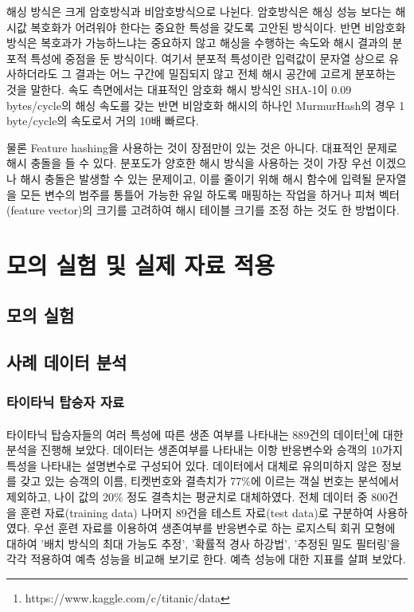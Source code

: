 \documentclass[oneside,b5paper,11pt]{book} %
\begin{document}
 해싱 방식은 크게 암호방식과 비암호방식으로 나뉜다. 암호방식은 해싱 성능 보다는 해시값 복호화가 어려워야 한다는 중요한 특성을 갖도록 고안된 방식이다. 반면 비암호화 방식은 복호과가 가능하느냐는 중요하지 않고 해싱을 수행하는 속도와 해시 결과의 분포적 특성에 중점을 둔 방식이다. 여기서 분포적 특성이란 입력값이 문자열 상으로 유사하더라도 그 결과는 어느 구간에 밀집되지 않고 전체 해시 공간에 고르게 분포하는 것을 말한다.\citep{Ramadhian2013} 속도 측면에서는 대표적인 암호화 해시 방식인 SHA-1이 0.09 bytes/cycle의 해싱 속도를 갖는 반면 비암호화 해시의 하나인 MurmurHash의 경우 1 byte/cycle의 속도로서 거의 10배 빠르다. 

 물론 Feature hashing을 사용하는 것이 장점만이 있는 것은 아니다. 대표적인 문제로 해시 충돌을 들 수 있다. 분포도가 양호한 해시 방식을 사용하는 것이 가장 우선 이겠으나 해시 충돌은 발생할 수 있는 문제이고, 이를 줄이기 위해 해시 함수에 입력될 문자열을 모든 변수의 범주를 통틀어 가능한 유일 하도록 매핑하는 작업을 하거나 피쳐 벡터(feature vector)의 크기를 고려하여 해시 테이블 크기를 조정 하는 것도 한 방법이다.



%
%
\chapter{모의 실험 및 실제 자료 적용}

\section{모의 실험}



\section{사례 데이터 분석}
\subsection{타이타닉 탑승자 자료}
 타이타닉 탑승자들의 여러 특성에 따른 생존 여부를 나타내는 889건의 데이터\footnote{https://www.kaggle.com/c/titanic/data}에 대한 분석을 진행해 보았다. 데이터는 생존여부를 나타내는 이항 반응변수와 승객의 10가지 특성을 나타내는 설명변수로 구성되어 있다. 데이터에서 대체로 유의미하지 않은 정보를 갖고 있는 승객의 이름, 티켓번호와 결측치가 77$\%$에 이르는 객실 번호는 분석에서 제외하고, 나이 값의 20$\%$ 정도 결측치는 평균치로 대체하였다. 전체 데이터 중 800건을 훈련 자료(training data) 나머지 89건을 테스트 자료(test data)로 구분하여 사용하였다.
 우선 훈련 자료를 이용하여 생존여부를 반응변수로 하는 로지스틱 회귀 모형에 대하여 '배치 방식의 최대 가능도 추정', '확률적 경사 하강법', '추정된 밀도 필터링'을 각각 적용하여 예측 성능을 비교해 보기로 한다. 예측 성능에 대한 지표를 살펴 보았다.
\end{document}
